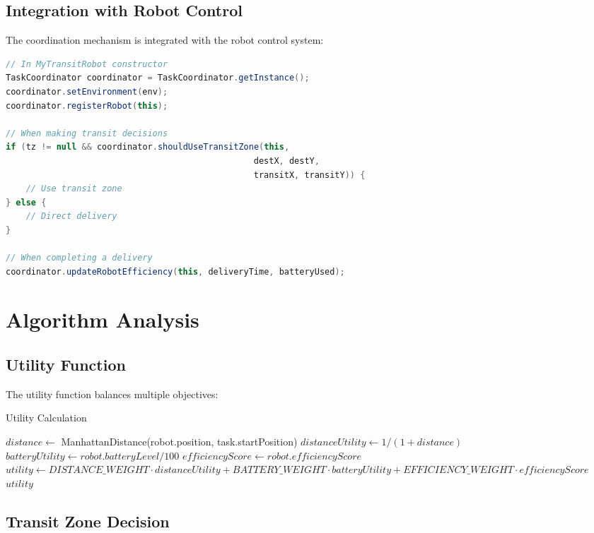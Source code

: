 \documentclass[12pt,a4paper]{article}
\begin{document}
\subsection{Integration with Robot Control}

The coordination mechanism is integrated with the robot control system:

\begin{lstlisting}[language=Java, caption=Robot Integration]
// In MyTransitRobot constructor
TaskCoordinator coordinator = TaskCoordinator.getInstance();
coordinator.setEnvironment(env);
coordinator.registerRobot(this);

// When making transit decisions
if (tz != null && coordinator.shouldUseTransitZone(this, 
                                                 destX, destY, 
                                                 transitX, transitY)) {
    // Use transit zone
} else {
    // Direct delivery
}

// When completing a delivery
coordinator.updateRobotEfficiency(this, deliveryTime, batteryUsed);
\end{lstlisting}

\section{Algorithm Analysis}

\subsection{Utility Function}

The utility function balances multiple objectives:

\begin{algorithm}
\caption{Utility Calculation}
\begin{algorithmic}[1]
    \State $distance \gets$ ManhattanDistance(robot.position, task.startPosition)
    \State $distanceUtility \gets 1 / (1 + distance)$
    \State $batteryUtility \gets robot.batteryLevel / 100$
    \State $efficiencyScore \gets robot.efficiencyScore$
    \State $utility \gets DISTANCE\_WEIGHT \cdot distanceUtility + BATTERY\_WEIGHT \cdot batteryUtility + EFFICIENCY\_WEIGHT \cdot efficiencyScore$
    \State \Return $utility$
\EndFunction
\end{algorithmic}
\end{algorithm}

\subsection{Transit Zone Decision}
\end{document}
